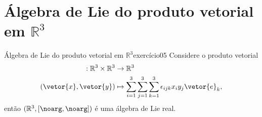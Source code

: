 \section[Álgebra de Lie do produto vetorial em R³]{Álgebra de Lie do produto vetorial em \(\mathbb{R}^3\)}
\begin{proposition}{Álgebra de Lie do produto vetorial em \(\mathbb{R}^3\)}{exercício05}
    Considere o produto vetorial
    \begin{align*}
        [\noarg, \noarg] : \mathbb{R}^3 \times \mathbb{R}^3 &\to \mathbb{R}^3\\
        (\vetor{x},\vetor{y}) &\mapsto \sum_{i = 1}^3 \sum_{j=1}^3\sum_{k = 1}^3 \epsilon_{ijk}x_iy_j\vetor{e}_k,
    \end{align*}
    então \((\mathbb{R}^3, [\noarg, \noarg])\) é uma álgebra de Lie real.
\end{proposition}
